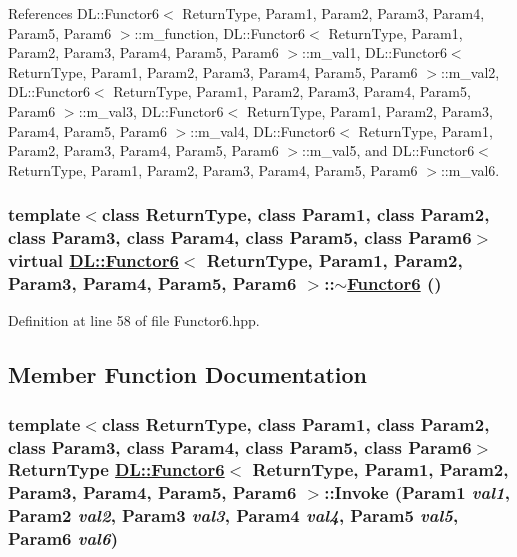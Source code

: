 References DL::Functor6$<$ Return\-Type, Param1, Param2, Param3, Param4, Param5, Param6 $>$::m\_\-function, DL::Functor6$<$ Return\-Type, Param1, Param2, Param3, Param4, Param5, Param6 $>$::m\_\-val1, DL::Functor6$<$ Return\-Type, Param1, Param2, Param3, Param4, Param5, Param6 $>$::m\_\-val2, DL::Functor6$<$ Return\-Type, Param1, Param2, Param3, Param4, Param5, Param6 $>$::m\_\-val3, DL::Functor6$<$ Return\-Type, Param1, Param2, Param3, Param4, Param5, Param6 $>$::m\_\-val4, DL::Functor6$<$ Return\-Type, Param1, Param2, Param3, Param4, Param5, Param6 $>$::m\_\-val5, and DL::Functor6$<$ Return\-Type, Param1, Param2, Param3, Param4, Param5, Param6 $>$::m\_\-val6.\hypertarget{classDL_1_1Functor6_a1}{
\subsubsection[$\sim$Functor6]{\setlength{\rightskip}{0pt plus 5cm}template$<$class Return\-Type, class Param1, class Param2, class Param3, class Param4, class Param5, class Param6$>$ virtual \hyperlink{classDL_1_1Functor6}{DL::Functor6}$<$ Return\-Type, Param1, Param2, Param3, Param4, Param5, Param6 $>$::$\sim$\hyperlink{classDL_1_1Functor6}{Functor6} ()}}
\label{classDL_1_1Functor6_a1}




Definition at line 58 of file Functor6.hpp.

\subsection{Member Function Documentation}
\hypertarget{classDL_1_1Functor6_a3}{
\subsubsection[Invoke]{\setlength{\rightskip}{0pt plus 5cm}template$<$class Return\-Type, class Param1, class Param2, class Param3, class Param4, class Param5, class Param6$>$ Return\-Type \hyperlink{classDL_1_1Functor6}{DL::Functor6}$<$ Return\-Type, Param1, Param2, Param3, Param4, Param5, Param6 $>$::Invoke (Param1 {\em val1}, Param2 {\em val2}, Param3 {\em val3}, Param4 {\em val4}, Param5 {\em val5}, Param6 {\em val6})}}
\label{classDL_1_1Functor6_a3}




